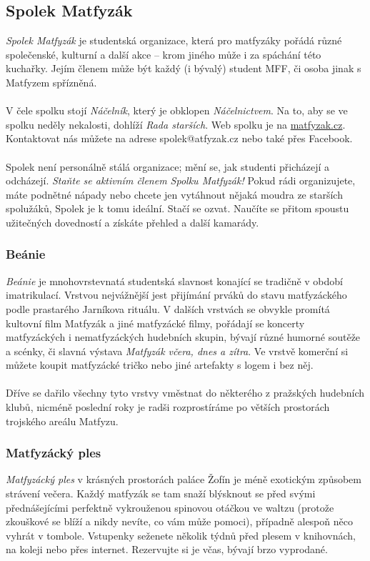 \subsection{Spolek Matfyzák}


\textit{Spolek Matfyzák} je studentská organizace, která pro matfyzáky pořádá
různé společenské, kulturní a další akce – krom jiného může i za spáchání této
kuchařky. Jejím členem může být každý (i bývalý) student MFF, či osoba jinak s
Matfyzem spřízněná.
\\\\
V čele spolku stojí \textit{Náčelník}, který je obklopen \textit{Náčelnictvem}.
Na to, aby se ve spolku neděly nekalosti, dohlíží \textit{Rada starších}. Web
spolku je na \url{matfyzak.cz}. Kontaktovat nás můžete na adrese
spolek@atfyzak.cz nebo také přes Facebook.
\\\\
Spolek není personálně stálá organizace; mění se, jak studenti přicházejí a
odcházejí. \textit{Staňte se aktivním členem Spolku Matfyzák!} Pokud rádi
organizujete, máte podnětné nápady nebo chcete jen vytáhnout nějaká moudra ze
starších spolužáků, Spolek je k tomu ideální. Stačí se ozvat. Naučíte se přitom
spoustu užitečných dovedností a získáte přehled a další kamarády.


\subsubsection{Beánie}
\textit{Beánie} je mnohovrstevnatá studentská slavnost konající se tradičně v
období imatrikulací. Vrstvou nejvážnější jest přijímání prváků do stavu
matfyzáckého podle prastarého Jarníkova rituálu. V dalších vrstvách se obvykle
promítá kultovní film Matfyzák a jiné matfyzácké filmy, pořádají se koncerty
matfyzáckých i nematfyzáckých hudebních skupin, bývají různé humorné soutěže a
scénky, či slavná výstava \textit{Matfyzák včera, dnes a zítra}. Ve vrstvě
komerční si můžete koupit matfyzácké tričko nebo jiné artefakty s logem i bez
něj.
\\\\
Dříve se dařilo všechny tyto vrstvy vměstnat do některého z pražských hudebních
klubů, nicméně poslední roky je radši rozprostíráme po větších prostorách
trojského areálu Matfyzu.


\subsubsection{Matfyzácký ples}
\textit{Matfyzácký ples} v krásných prostorách paláce Žofín je méně exotickým
způsobem strávení večera. Každý matfyzák se tam snaží blýsknout se před svými
přednášejícími perfektně vykrouženou spinovou otáčkou ve waltzu (protože
zkouškové se blíží a nikdy nevíte, co vám může pomoci), případně alespoň něco
vyhrát v tombole. Vstupenky seženete několik týdnů před plesem v knihovnách, na
koleji nebo přes internet. Rezervujte si je včas, bývají brzo vyprodané.


